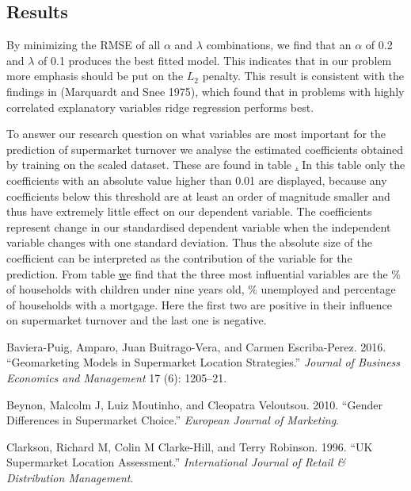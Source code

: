 \documentclass[
]{article}
\begin{document}
\hypertarget{results}{%
\subsection{Results}\label{results}}

By minimizing the RMSE of all \(\alpha\) and \(\lambda\) combinations,
we find that an \(\alpha\) of 0.2 and \(\lambda\) of 0.1 produces the
best fitted model. This indicates that in our problem more emphasis
should be put on the \(L_2\) penalty. This result is consistent with the
findings in (Marquardt and Snee 1975), which found that in problems with
highly correlated explanatory variables ridge regression performs best.

To answer our research question on what variables are most important for
the prediction of supermarket turnover we analyse the estimated
coefficients obtained by training on the scaled dataset. These are found
in table \href{resultTable}. In this table only the coefficients with an
absolute value higher than 0.01 are displayed, because any coefficients
below this threshold are at least an order of magnitude smaller and thus
have extremely little effect on our dependent variable. The coefficients
represent change in our standardised dependent variable when the
independent variable changes with one standard deviation. Thus the
absolute size of the coefficient can be interpreted as the contribution
of the variable for the prediction. From table
\href{resultTable} we find that the three most influential variables are the $\%$ of households with children under nine years old, $\%$ unemployed and percentage of households with a mortgage. Here the first two are positive in their influence on supermarket turnover and the last one is negative.

\hypertarget{refs}{}
\leavevmode\hypertarget{ref-baviera2016geomarketing}{}%
Baviera-Puig, Amparo, Juan Buitrago-Vera, and Carmen Escriba-Perez.
2016. ``Geomarketing Models in Supermarket Location Strategies.''
\emph{Journal of Business Economics and Management} 17 (6): 1205--21.

\leavevmode\hypertarget{ref-beynon2010gender}{}%
Beynon, Malcolm J, Luiz Moutinho, and Cleopatra Veloutsou. 2010.
``Gender Differences in Supermarket Choice.'' \emph{European Journal of
Marketing}.

\leavevmode\hypertarget{ref-clarkson1996uk}{}%
Clarkson, Richard M, Colin M Clarke-Hill, and Terry Robinson. 1996. ``UK
Supermarket Location Assessment.'' \emph{International Journal of Retail
\& Distribution Management}.
\end{document}
